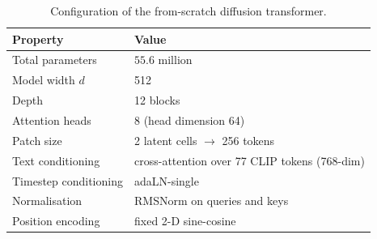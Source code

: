 \documentclass[11pt,a4paper]{article}
\begin{document}
\begin{table}[htbp]
\centering
\caption{Configuration of the from-scratch diffusion transformer.}
\begin{tabular}{@{}ll@{}}
\toprule
\textbf{Property} & \textbf{Value} \\
\midrule
Total parameters & $55.6$ million \\
Model width $d$ & 512 \\
Depth & 12 blocks \\
Attention heads & 8 (head dimension 64) \\
Patch size & 2 latent cells $\rightarrow$ 256 tokens \\
Text conditioning & cross-attention over 77 CLIP tokens (768-dim) \\
Timestep conditioning & adaLN-single \\
Normalisation & RMSNorm on queries and keys \\
Position encoding & fixed 2-D sine-cosine \\
\bottomrule
\end{tabular}
\end{table}
\end{document}
